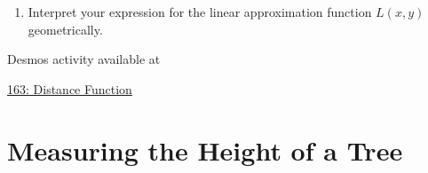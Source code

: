 \documentclass{ximera}
\begin{document}
\begin{question}
\begin{enumerate}
\item Interpret your expression for the linear approximation function $L(x,y)$ geometrically.

\end{enumerate}

\begin{onlineOnly}
    \begin{center}
\end{center}
\end{onlineOnly}

Desmos activity available at

\href{https://www.desmos.com/calculator/eqr9rtyyde}{163: Distance Function}

\end{question}

\section{Measuring the Height of a Tree}
\end{document}
